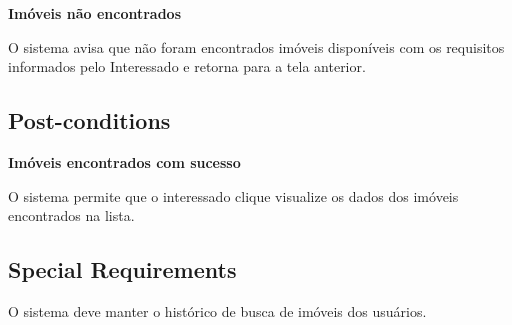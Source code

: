 \textbf{Imóveis não encontrados}

O sistema avisa que não foram encontrados imóveis disponíveis com os requisitos informados pelo
Interessado e retorna para a tela anterior.

\subsection*{Post-conditions}

\textbf{Imóveis encontrados com sucesso}

O sistema permite que o interessado clique visualize os dados dos imóveis encontrados na lista.

\subsection*{Special Requirements} 

O sistema deve manter o histórico de busca de imóveis dos usuários.